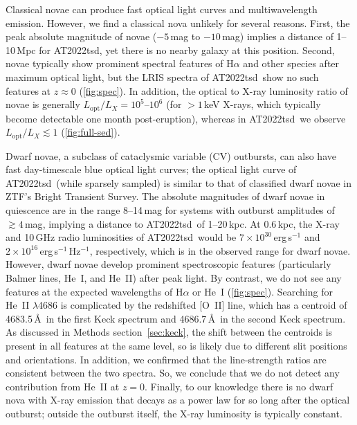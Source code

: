 \documentclass{nature_plusfigure}
\newcommand{\at}{AT2022tsd}
\begin{document}
\begin{methods}
Classical novae can produce fast optical light curves and multiwavelength emission\cite{Chomiuk2021}. However, we find a classical nova unlikely for several reasons. First, the peak absolute magnitude of novae ($-5\,$mag to $-10\,$mag\cite{Chomiuk2021}) implies a distance of 1--10\,Mpc for \at, yet there is no nearby galaxy at this position. Second, novae typically show prominent spectral features of H$\alpha$ and other species after maximum optical light\cite{Chomiuk2021}, but the LRIS spectra of \at\ show no such features at $z\approx0$ (\ref{fig:spec}). In addition, the optical to X-ray luminosity ratio of novae is generally $L_\mathrm{opt}/L_X=10^{5}$--$10^{6}$ (for $>1\,$keV X-rays, which typically become detectable one month post-eruption\cite{Chomiuk2021}), whereas in \at\ we observe $L_\mathrm{opt}/L_X\lesssim1$ (\ref{fig:full-sed}).

Dwarf novae, a subclass of cataclysmic variable (CV) outbursts, can also have fast day-timescale blue optical light curves; the optical light curve of \at\ (while sparsely sampled) is similar to that of classified dwarf novae in ZTF's Bright Transient Survey\cite{FremlingBTS,PerleyBTS}. The absolute magnitudes of dwarf novae in quiescence are in the range  8--14\,mag for systems with outburst amplitudes of $\gtrsim4\,$mag\cite{Szkody2021}, implying a distance to \at\ of 1--20\,kpc. At 0.6\,kpc, the X-ray and 10\,GHz radio luminosities of \at\ would be $7\times10^{30}\,$erg\,s$^{-1}$ and $2\times10^{16}$\,erg\,s$^{-1}$\,Hz$^{-1}$, respectively, which is in the observed range for dwarf novae\cite{Polzin2022,Coppejans2020_CV}. 
However, dwarf novae develop prominent spectroscopic features (particularly Balmer lines, He~I, and He~II) after peak light\cite{Morales-Rueda2002,Han2020}. By contrast, we do not see any features at the expected wavelengths of H$\alpha$ or He~I (\ref{fig:spec}). Searching for He~II $\lambda$4686 is complicated by the redshifted [O~II] line, which has a centroid of 4683.5\,\AA\ in the first Keck spectrum and 4686.7\,\AA\ in the second Keck spectrum. 
As discussed in Methods section~\ref{sec:keck}, the shift between the centroids is present in all features at the same level, so is likely due to different slit positions and orientations. In addition, we confirmed that the line-strength ratios are consistent between the two spectra. So, we conclude that we do not detect any contribution from He~II at $z=0$.
Finally, to our knowledge there is no dwarf nova with X-ray emission that decays as a power law for so long after the optical outburst; outside the outburst itself, the X-ray luminosity is typically constant\cite{Fertig2011}.


\end{methods}
\end{document}
